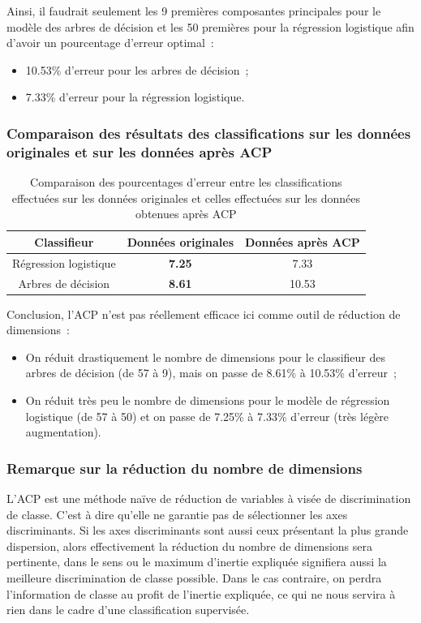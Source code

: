 \documentclass[a4paper,10pt]{report}
\begin{document}
Ainsi, il faudrait seulement les 9 premières composantes principales pour le modèle des arbres de décision et les 50 premières pour la régression logistique afin d'avoir un pourcentage d'erreur optimal~:
\begin{itemize}
	\item 10.53\% d'erreur pour les arbres de décision~;
	\item 7.33\% d'erreur pour la régression logistique.
\end{itemize}


\subsubsection{Comparaison des résultats des classifications sur les données originales et sur les données après ACP}
\begin{table}[H]
	\centering
	\captionsetup{justification=centering, margin=2cm}
	\begin{tabular}{c|c|c}
		Classifieur & Données originales & Données après ACP \\ 
		\hline
		Régression logistique & \textbf{7.25} & 7.33 \\ 
		Arbres de décision& \textbf{8.61} & 10.53 \\ 
	\end{tabular}
	\caption{\small Comparaison des pourcentages d'erreur entre les classifications effectuées sur les données originales et celles effectuées sur les données obtenues après ACP}
	\label{table:3-3-ACP-scale-center-spam-comparaison-taux-erreur-avant-apres-ACP}
\end{table}


Conclusion, l'ACP n'est pas réellement efficace ici comme outil de réduction de dimensions~:
\begin{itemize}
	\item On réduit drastiquement le nombre de dimensions pour le classifieur des arbres de décision (de 57 à 9), mais on passe de 8.61\% à 10.53\% d'erreur~;
	\item On réduit très peu le nombre de dimensions pour le modèle de régression logistique (de 57 à 50) et on passe de 7.25\% à 7.33\% d'erreur (très légère augmentation).
\end{itemize}



\subsubsection{Remarque sur la réduction du nombre de dimensions}
L'ACP est une méthode naïve de réduction de variables à visée de discrimination de classe. C'est à dire qu'elle ne garantie pas de sélectionner les axes discriminants. Si les axes discriminants sont aussi ceux présentant la plus grande dispersion, alors effectivement la réduction du nombre de dimensions sera pertinente, dans le sens ou le maximum d'inertie expliquée signifiera aussi la meilleure discrimination de classe possible. Dans le cas contraire, on perdra l'information de classe au profit de l'inertie expliquée, ce qui ne nous servira à rien dans le cadre d'une classification supervisée.
\end{document}
